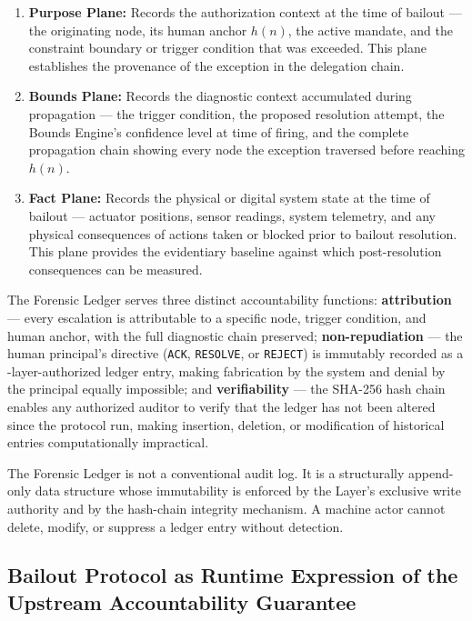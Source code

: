 \begin{enumerate}\itemsep=0pt
\item \textbf{Purpose Plane:} Records the authorization context at the time of bailout — the originating node, its human anchor $h(n)$, the active mandate, and the constraint boundary or trigger condition that was exceeded. This plane establishes the provenance of the exception in the delegation chain.

\item \textbf{Bounds Plane:} Records the diagnostic context accumulated during propagation — the trigger condition, the proposed resolution attempt, the Bounds Engine's confidence level at time of firing, and the complete propagation chain showing every node the exception traversed before reaching $h(n)$.

\item \textbf{Fact Plane:} Records the physical or digital system state at the time of bailout — actuator positions, sensor readings, system telemetry, and any physical consequences of actions taken or blocked prior to bailout resolution. This plane provides the evidentiary baseline against which post-resolution consequences can be measured.
\end{enumerate}

The Forensic Ledger serves three distinct accountability functions: \textbf{attribution} — every escalation is attributable to a specific node, trigger condition, and human anchor, with the full diagnostic chain preserved; \textbf{non-repudiation} — the human principal's directive (\texttt{ACK}, \texttt{RESOLVE}, or \texttt{REJECT}) is immutably recorded as a \purpose{}-layer-authorized ledger entry, making fabrication by the system and denial by the principal equally impossible; and \textbf{verifiability} — the SHA-256 hash chain enables any authorized auditor to verify that the ledger has not been altered since the protocol run, making insertion, deletion, or modification of historical entries computationally impractical.

The Forensic Ledger is not a conventional audit log. It is a structurally append-only data structure whose immutability is enforced by the \fact{} Layer's exclusive write authority and by the hash-chain integrity mechanism. A machine actor cannot delete, modify, or suppress a ledger entry without detection.

\subsection{Bailout Protocol as Runtime Expression of the Upstream Accountability Guarantee}
\label{sec:runtime-expression}

